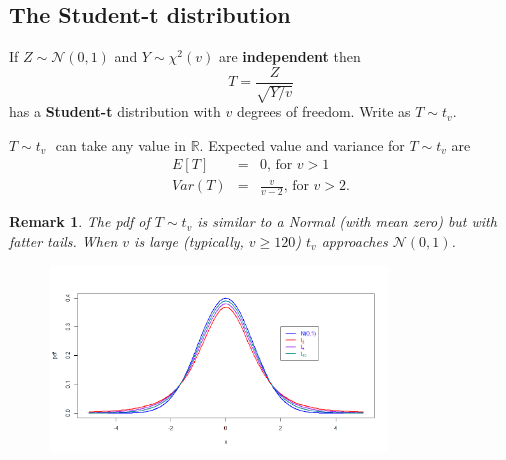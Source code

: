 \documentclass[notes=show,smaller,handout]{beamer}\usepackage[]{graphicx}\usepackage[]{color}
\newtheorem{remark}{Remark}[section]
\newcommand{\N}{\mathcal{N}}
\begin{document}
\subsection{The Student-t distribution}

\begin{frame}{\subsecname}
  \begin{definition}
  If $Z\sim \N(0,1)$ and $Y\sim \chi ^{2}(v)$ are \textbf{independent}
  then%
  \begin{equation*}
  T=\frac{Z}{\sqrt{Y/v}}
  \end{equation*}%
  has a \textbf{Student-t} distribution with $v$ degrees of freedom. Write as $T\sim t_{v}$.
  \end{definition}
  \bigskip
  $T\sim t_{v}\,$\ can take any value in $\mathbb{R}$. Expected value and variance for $T\sim t_{v}$ are
  \begin{eqnarray*}
  E\left[ T\right] &=&0\text{, for }v>1 \\
  Var\left( T\right) &=&\frac{v}{v-2}\text{, for }v>2.
  \end{eqnarray*}
\end{frame}

\begin{frame}{\subsecname}
  \begin{remark}
  The pdf of $T\sim t_{v}$ is similar to a Normal (with mean zero) but with fatter tails. When $v$ is large (typically, $v \geq 120$) $t_{v}$ approaches $\N(0,1)$.
  \end{remark}

  \begin{figure}[ptb]\centering
  \includegraphics[height=1.9398in, width=3.5345in]{img/student_t__4.pdf}%
  \end{figure}
\end{frame}
\end{document}
